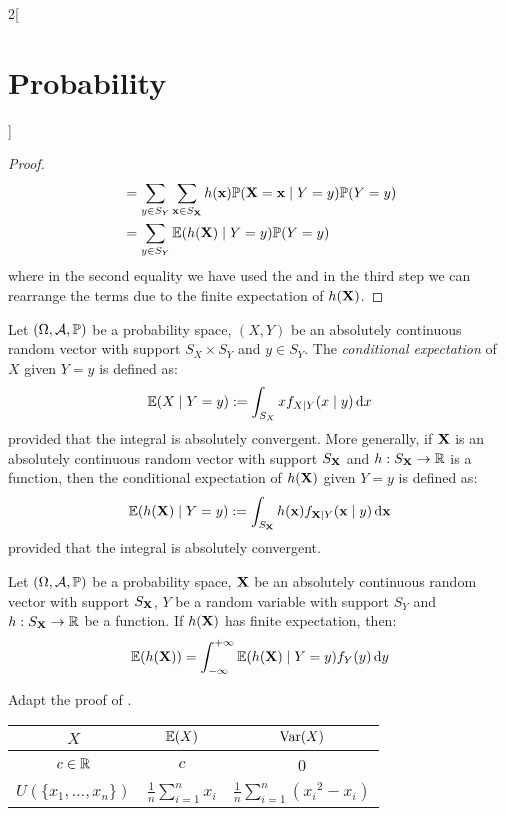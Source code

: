 \documentclass[../../../main_math.tex]{subfiles}
\begin{document}
\begin{multicols}{2}[\section{Probability}]
\begin{proof}
\begin{align*}
                      & =\sum_{y\in S_Y}\sum_{\boldsymbol{\mathrm{x}}\in S_{\boldsymbol{\mathrm{X}}}}h(\boldsymbol{\mathrm{x}})\mathbb{P}(\boldsymbol{\mathrm{X}}=\boldsymbol{\mathrm{x}}\mid Y=y)\mathbb{P}(Y=y) \\
                      & =\sum_{y\in S_Y}\mathbb{E}(h(\boldsymbol{\mathrm{X}})\mid Y=y)\mathbb{P}(Y=y)
    \end{align*}
    where in the second equality we have used the  and in the third step we can rearrange the terms due to the finite expectation of $h(\boldsymbol{\mathrm{X}})$.
  \end{proof}
  \begin{definition}
    Let $(\Omega,\mathcal{A},\mathbb{P})$ be a probability space, $(X,Y)$ be an absolutely continuous random vector with support $S_X\times S_Y$ and $y\in S_Y$. The \emph{conditional expectation} of $X$ given $Y=y$ is defined as: $$\mathbb{E}(X\mid Y=y):=\int_{S_{X}}xf_{X\mid Y}(x\mid y)\dd{x}$$ provided that the integral is absolutely convergent. More generally, if $\boldsymbol{\mathrm{X}}$ is an absolutely continuous random vector with support $S_{\boldsymbol{\mathrm{X}}}$ and $h:S_{\boldsymbol{\mathrm{X}}}\rightarrow\mathbb{R}$ is a function, then the conditional expectation of $h(\boldsymbol{\mathrm{X}})$ given $Y=y$ is defined as: $$\mathbb{E}(h(\boldsymbol{\mathrm{X}})\mid Y=y):=\int_{S_{\boldsymbol{\mathrm{X}}}}h(\boldsymbol{\mathrm{x}})f_{\boldsymbol{\mathrm{X}}\mid Y}(\boldsymbol{\mathrm{x}}\mid y)\dd{\boldsymbol{\mathrm{x}}}$$ provided that the integral is absolutely convergent.
  \end{definition}
  \begin{proposition}
    Let $(\Omega,\mathcal{A},\mathbb{P})$ be a probability space, $\boldsymbol{\mathrm{X}}$ be an absolutely continuous random vector with support $S_{\boldsymbol{\mathrm{X}}}$, $Y$ be a random variable with support $S_Y$ and $h:S_{\boldsymbol{\mathrm{X}}}\rightarrow\mathbb{R}$ be a function. If $h(\boldsymbol{\mathrm{X}})$ has finite expectation, then: $$\mathbb{E}(h(\boldsymbol{\mathrm{X}}))=\int_{-\infty}^{+\infty}\mathbb{E}(h(\boldsymbol{\mathrm{X}})\mid Y=y)f_Y(y)\dd{y}$$
  \end{proposition}
  \begin{sproof}
    Adapt the proof of .
  \end{sproof}
  \begin{center}
    \def\arraystretch{1.25}
    \begin{tabular}{|c|c|c|}
      \hline
      $X$                          & $\displaystyle \mathbb{E}(X)$       & $\displaystyle \mathrm{Var}(X)$                     \\
      \hline
      $c\in\mathbb{R}$                    & $\displaystyle c$             & 0                                           \\
      $U(\{x_1,\ldots,x_n\})$      & $\frac{1}{n}\sum_{i=1}^n x_i$ & $\frac{1}{n}\sum_{i=1}^n ({x_i}^2-x_i)$     \\

\end{tabular}
\end{center}
\end{multicols}
\end{document}
